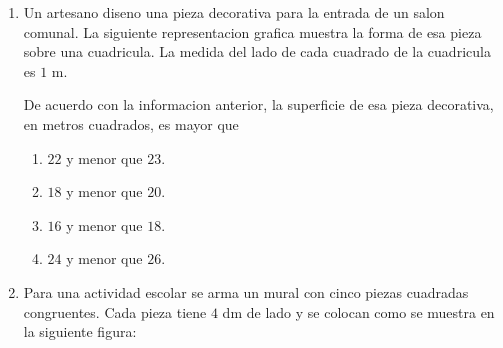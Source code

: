 \documentclass[12pt]{article}
\begin{document}
\begin{enumerate}[label=\textbf{\arabic*.}, itemsep=1.05cm]
Si se coloca una cinta alrededor de todo el borde de esa senal, \textquestiondown cuantos centimetros de cinta se necesitan?

\begin{enumerate}[label=\Alph*)]
  \item $27$
  \item $36$
  \item $54$
  \item $108$
\end{enumerate}

\Needspace{0.92\textheight}
\item
Un artesano diseno una pieza decorativa para la entrada de un salon comunal. La siguiente representacion grafica muestra la forma de esa pieza sobre una cuadricula. La medida del lado de cada cuadrado de la cuadricula es $1$ m.

\begin{center}
\end{center}

De acuerdo con la informacion anterior, la superficie de esa pieza decorativa, en metros cuadrados, es mayor que

\begin{enumerate}[label=\Alph*)]
  \item $22$ y menor que $23$.
  \item $18$ y menor que $20$.
  \item $16$ y menor que $18$.
  \item $24$ y menor que $26$.
\end{enumerate}

\Needspace{0.88\textheight}
\item
Para una actividad escolar se arma un mural con cinco piezas cuadradas congruentes. Cada pieza tiene $4$ dm de lado y se colocan como se muestra en la siguiente figura:


\end{enumerate}
\end{document}
